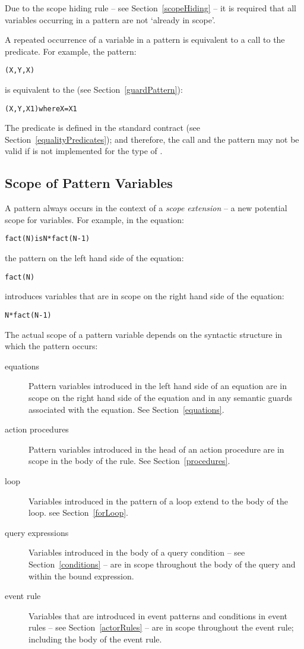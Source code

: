Due to the scope hiding rule -- see Section~\vref{scopeHiding} -- it is required that all variables occurring in a pattern are not `already in scope'.

\begin{aside}
A repeated occurrence of a variable in a pattern is equivalent to a call to the \q{=} predicate. For example, the pattern:
\begin{alltt}
(X,Y,X)
\end{alltt}
is equivalent to the  (see Section~\vref{guardPattern}):
\begin{alltt}
(X,Y,X1) where X=X1
\end{alltt}
The \q{=} predicate is defined in the standard  contract (see Section~\vref{equalityPredicates}); and therefore, the call and the pattern may not be valid if  is not implemented for the type of .
\end{aside}

\subsection{Scope of Pattern Variables}
A pattern always occurs in the context of a \emph{scope extension} -- a new potential scope for variables. For example, in the equation:
\begin{alltt}
fact(N) is N*fact(N-1)
\end{alltt}
the pattern on the left hand side of the equation:
\begin{alltt}
fact(N)
\end{alltt}
introduces variables that are in scope on the right hand side of the equation:
\begin{alltt}
N*fact(N-1)
\end{alltt}

The actual scope of a pattern variable depends on the syntactic structure in which the pattern occurs: 
\begin{description}
\item[equations]
Pattern variables introduced in the left hand side of an equation are in scope on the right hand side of the equation and in any semantic guards associated with the equation. See Section~\vref{equations}.
\item[action procedures]
Pattern variables introduced in the head of an action procedure are in scope in the body of the rule. See Section~\vref{procedures}.
\item[ loop]
Variables introduced in the pattern of a  loop extend to the body of the loop. see Section~\vref{forLoop}.
\item[query expressions]
Variables introduced in the body of a query condition -- see Section~\vref{conditions} -- are in scope throughout the body of the query and within the bound expression.
\item[event rule]
Variables that are introduced in event patterns and conditions in event rules -- see Section~\vref{actorRules} -- are in scope throughout the event rule; including the body of the event rule.
\end{description}

